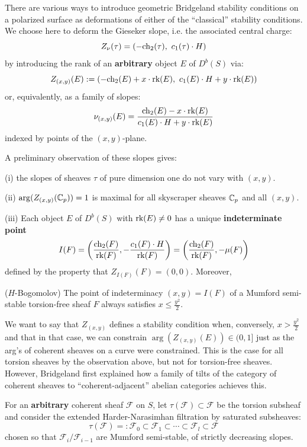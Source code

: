\documentclass{amsart}
\begin{document}
\medskip

There are various ways to introduce geometric Bridgeland stability conditions on a polarized surface 
as deformations of  either of the ``classical'' stability conditions. We choose here to deform the Gieseker slope, i.e.
the associated central charge:
\[ Z_\nu(\tau) = (-\mbox{ch}_2(\tau), \ c_1(\tau) \cdot H) \] 
by introducing the rank of an {\bf arbitrary} object $E$ of $D^b(S)$ via: 
\[ Z_{(x,y)}(E) :=  ( -\mbox{ch}_2(E) + x\cdot \mbox{rk}(E), \ c_1(E) \cdot H + y\cdot \mbox{rk}(E))  \] 
or, equivalently, as a family of slopes:
\[ \nu_{(x,y)}(E) = \frac{\mbox{ch}_2(E) - x\cdot \mbox{rk}(E)}{c_1(E)\cdot H + y\cdot \mbox{rk}(E)} \] 
indexed by points of the $(x,y)$-plane. 

\medskip

A preliminary observation of these slopes gives:

\medskip

(i) the slopes of sheaves $\tau$ of pure dimension one do not vary with $(x,y)$.   

\medskip

(ii) $\arg(Z_{(x,y)}({\mathbb C}_p)) = 1$ is maximal for all skyscraper sheaves ${\mathbb C}_p$ and all $(x,y)$. 

\medskip

(iii) Each object $E$ of $D^b(S)$ with $\mbox{rk}(E) \ne 0$ has a unique  {\bf indeterminate point} 
\[ I(F) = \left( \frac{\mbox{ch}_2(F)}{\mbox{rk}(F)}, - \frac{c_1(F)\cdot H}{\mbox{rk}(F)} \right) = \left( \frac{\mbox{ch}_2(F)}{\mbox{rk}(F)}, - \mu(F) \right) \] 
defined by the property that $Z_{I(F)}(F) = (0,0)$. Moreover, 

\medskip

 ($H$-Bogomolov) The point of  indeterminacy $(x,y) = I(F)$ of a 
Mumford semi-stable torsion-free sheaf $F$ always satisfies $x \le \frac {y^2} 2$.

\medskip

We want to say that $Z_{(x,y)}$ defines a stability condition when, conversely, 
$x > \frac {y^2} 2$ 
and that in that case, we can constrain $\arg(Z_{(x,y)}(E)) \in (0,1]$ just 
as the arg's of coherent sheaves on a curve were constrained. 
This is the case for all torsion sheaves by the observation above, but not for torsion-free sheaves. However, 
Bridgeland first explained how a family of tilts of the category of coherent sheaves to 
``coherent-adjacent'' abelian categories achieves this. 

\medskip

For an {\bf arbitrary} coherent sheaf ${\mathcal F}$ on $S$, let $\tau({\mathcal F}) \subset {\mathcal F}$ be the torsion subsheaf and  
consider the extended Harder-Narasimhan filtration by saturated subsheaves:
\[ \tau({\mathcal F})  =: {\mathcal F}_0 \subset {\mathcal F}_1 \subset \cdots \subset {\mathcal F}_l \subset {\mathcal F} \] 
chosen so that
${\mathcal F}_{i}/{\mathcal F}_{i-1}$ are Mumford semi-stable, of strictly decreasing slopes. 
\end{document}
